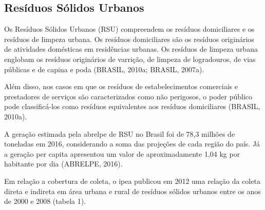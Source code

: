 	\subsection{Resíduos Sólidos Urbanos}
	Os Resíduos Sólidos Urbanos (RSU) compreendem os resíduos domiciliares e os resíduos de limpeza urbana. Os resíduos domiciliares são os resíduos originários de atividades domésticas em residências urbanas. Os resíduos de limpeza urbana englobam os resíduos originários de varrição, de limpeza de logradouros, de vias públicas e de capina e poda (BRASIL, 2010a; BRASIL, 2007a).
	
	Além disso, nos casos em que os resíduos de estabelecimentos comerciais e prestadores de serviços são caracterizados como não perigosos, o poder público pode classificá-los como resíduos equivalentes aos resíduos domiciliares (BRASIL, 2010a).
	
	A geração estimada pela \gls{abrelpe} de RSU no Brasil foi de 78,3 milhões de toneladas em 2016, considerando a soma das projeções de cada região do país. Já a geração per capita apresentou um valor de aproximadamente 1,04 kg por habitante por dia (ABRELPE, 2016).
	
	Em relação a cobertura de coleta, o \gls{ipea} publicou em 2012 uma relação da coleta direta e indireta em área urbana e rural de resíduos sólidos urbanos entre os anos de 2000 e 2008 (tabela 1).